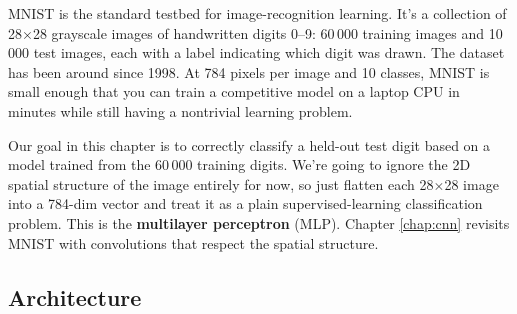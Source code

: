 MNIST is the standard testbed for image-recognition learning. It's a
collection of 28$\times$28 grayscale images of handwritten digits
0--9: 60\,000 training images and 10\,000 test images, each with a
label indicating which digit was drawn. The dataset has been around
since 1998. At 784 pixels per image and 10 classes, MNIST is small
enough that you can train a competitive model on a laptop CPU in
minutes while still having a nontrivial learning problem.

Our goal in this chapter is to correctly classify a held-out test
digit based on a model trained from the 60\,000 training digits.
We're going to ignore the 2D spatial structure of the image entirely
for now, so just flatten each 28$\times$28 image into a 784-dim
vector and treat it as a plain supervised-learning classification
problem. This is the \textbf{multilayer perceptron} (MLP). Chapter
\ref{chap:cnn} revisits MNIST with convolutions that respect the
spatial structure.

\subsection*{Architecture}

\begin{center}
\end{center}

